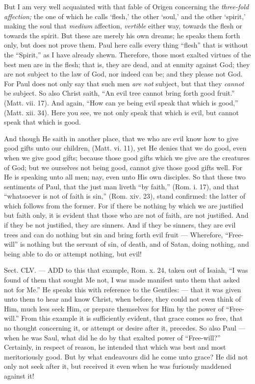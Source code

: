 But I am very well acquainted with that fable of Origen concerning the \emph{three-fold affection; }the one of which he calls ‘flesh,’ the other ‘soul,’ and the other ‘spirit,’ making the soul that \emph{medium }affection, \emph{vertible }either way, towards the flesh or towards the spirit. But these are merely his own dreams; he speaks them forth only, but does not prove them. Paul here calls every thing “flesh” that is without the “Spirit,” as I have already shewn. Therefore, those most exalted virtues of the best men are in the flesh; that is, they are dead, and at enmity against God; they are not subject to the law of God, nor indeed can be; and they please not God. For Paul does not only say that such men \emph{are not }subject, but that they \emph{cannot }be subject. So also Christ saith, “An evil tree cannot bring forth good fruit.” (Matt. vii. 17). And again, “How can ye being evil speak that which is good,” (Matt. xii. 34). Here you see, we not only speak that which is evil, but cannot speak that which is good.

And though He saith in another place, that we who are evil know how to give good gifts unto our children, (Matt. vi. 11), yet He denies that we do good, even when we give good gifts; because those good gifts which we give are the creatures of God; but we ourselves not being good, cannot give those good gifts well. For He is speaking unto all men; nay, even unto His own disciples. So that these two sentiments of Paul, that the just man liveth “by faith,” (Rom. i. 17), and that “whatsoever is not of faith is sin,” (Rom. xiv. 23), stand confirmed: the latter of which follows from the former. For if there be nothing by which we are justified but faith only, it is evident that those who are not of faith, are not justified. And if they be not justified, they are sinners. And if they be sinners, they are evil trees and can do nothing but sin and bring forth evil fruit — Wherefore, “Free-will” is nothing but the servant of sin, of death, and of Satan, doing nothing, and being able to do or attempt nothing, but evil!


Sect. CLV. — ADD to this that example, Rom. x. 24, taken out of Isaiah, “I was found of them that sought Me not, I was made manifest unto them that asked not for Me.” He speaks this with reference to the Gentiles: — that it was given unto them to hear and know Christ, when before, they could not even think of Him, much less seek Him, or prepare themselves for Him by the power of “Free-will.” From this example it is sufficiently evident, that grace comes so free, that no thought concerning it, or attempt or desire after it, precedes. So also Paul — when he was Saul, what did he do by that exalted power of “Free-will?” Certainly, in respect of reason, he intended that which was best and most meritoriously good. But by what endeavours did he come unto grace? He did not only not seek after it, but received it even when he was furiously maddened against it!

